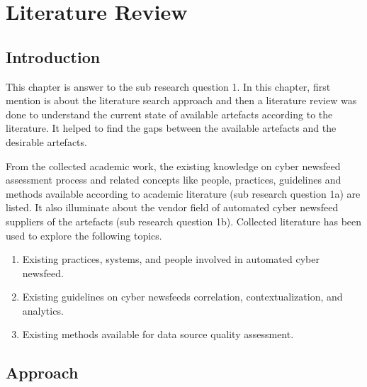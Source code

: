 
\chapter{Literature Review} %

\label{Chapter7_literature-review} %

\section{Introduction }
This chapter is answer to the sub research question 1. 
In this chapter, first mention 
is about the literature search approach 
and then a literature review was done to understand the current state of available artefacts according to the literature. 
It helped to find the gaps between the available artefacts 
and the desirable artefacts. 

From the collected academic work, 
the existing knowledge on cyber newsfeed assessment process 
and related concepts like people, practices, 
guidelines and methods available according to academic literature 
(sub research question 1a) are listed. 
It also illuminate about the vendor field of automated cyber newsfeed suppliers of the artefacts (sub research question 1b).  
Collected literature has been used to explore the following topics.

\begin{enumerate}
    \item Existing practices, systems, and people involved in automated cyber newsfeed.
   
    \item Existing guidelines on cyber newsfeeds correlation, contextualization, and analytics. 
    
     \item Existing methods available for data source quality assessment.
\end{enumerate}

\section{Approach}

